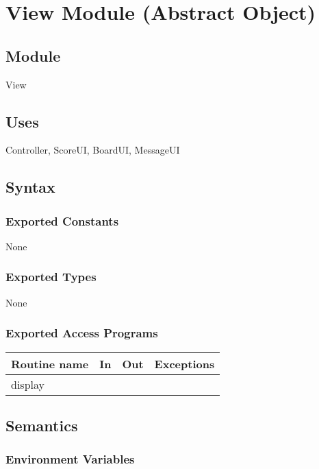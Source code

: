 \documentclass[12pt]{article}
\begin{document}
\newpage

\section* {View Module (Abstract Object)}

\subsection*{Module}

View

\subsection* {Uses}

Controller, ScoreUI, BoardUI, MessageUI

\subsection* {Syntax}

\subsubsection* {Exported Constants}

None

\subsubsection* {Exported Types}

None

\subsubsection* {Exported Access Programs}

\begin{tabular}{| l | l | l | p{6cm} |}
\hline
\textbf{Routine name} & \textbf{In} & \textbf{Out} & \textbf{Exceptions}\\
\hline
display & & &  \\
\hline
\end{tabular}

\subsection* {Semantics}

\subsubsection* {Environment Variables}
\end{document}

